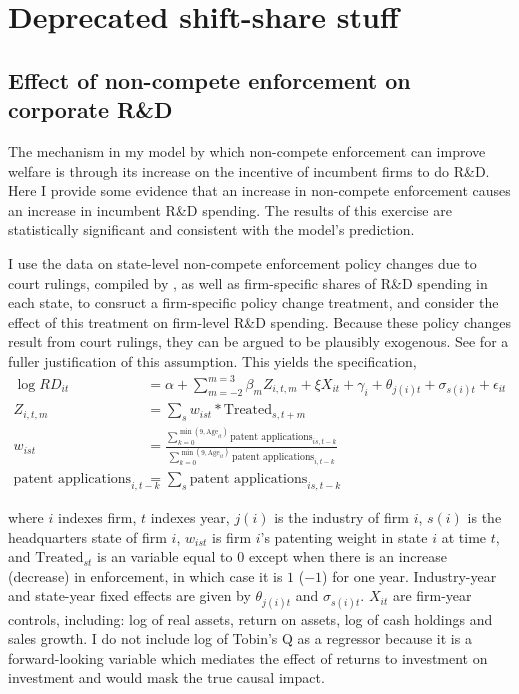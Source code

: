 \documentclass[11pt,english]{article}
\theoremstyle{remark}
\begin{document}
	
\section{Deprecated shift-share stuff} 



\subsection{Effect of non-compete enforcement on corporate R\&D}

The mechanism in my model by which non-compete enforcement can improve welfare is through its increase on the incentive of incumbent firms to do R\&D. Here I provide some evidence that an increase in non-compete enforcement causes an increase in incumbent R\&D spending. The results of this exercise are statistically significant and consistent with the model's prediction.

I use the data on state-level non-compete enforcement policy changes due to court rulings, compiled by \cite{jeffers_impact_2018}, as well as firm-specific shares of R\&D spending in each state, to consruct a firm-specific policy change treatment, and consider the effect of this treatment on firm-level R\&D spending. Because these policy changes result from court rulings, they can be argued to be plausibly exogenous. See \cite{jeffers_impact_2018} for a fuller justification of this assumption. This yields the specification,
\begin{align}
\log RD_{it} &= \alpha + \sum_{m=-2}^{m=3} \beta_m Z_{i,t,m} + \xi X_{it} + \gamma_i + \theta_{j(i)t} + \sigma_{s(i)t} + \epsilon_{it} \label{noncompete_shiftshare_specification} \\
Z_{i,t,m} &= \sum_s w_{ist} * \textrm{Treated}_{s,t+m} \nonumber \\
w_{ist} &= \frac{\sum_{k=0}^{\min(9,\textrm{Age}_{it})} \textrm{patent applications}_{is,t-k}}{\sum_{k=0}^{\min(9,\textrm{Age}_{it})} \textrm{patent applications}_{i,t-k}} \nonumber  \\
\textrm{patent applications}_{i,t-k} &= \sum_s \textrm{patent applications}_{is,t-k} \nonumber
\end{align}

where $i$ indexes firm, $t$ indexes year, $j(i)$ is the industry of firm $i$, $s(i)$ is the headquarters state of firm $i$, $w_{ist}$ is firm $i$'s patenting weight in state $i$ at time $t$, and $\textrm{Treated}_{st}$ is an variable equal to $0$ except when there is an increase (decrease) in enforcement, in which case it is $1$ ($-1$) for one year. Industry-year and state-year fixed effects are given by $\theta_{j(i)t}$ and $\sigma_{s(i)t}$. $X_{it}$ are firm-year controls, including: log of real assets, return on assets, log of cash holdings and sales growth. I do not include log of Tobin's Q as a regressor because it is a forward-looking variable which mediates the effect of returns to investment on investment and would mask the true causal impact. 
\end{document}
